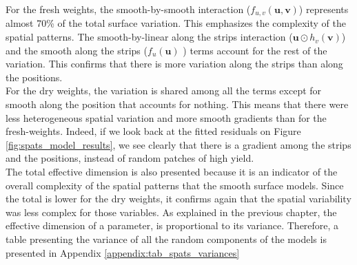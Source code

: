 For the fresh weights, the smooth-by-smooth interaction ($f_{u, v}(\boldsymbol{u}, \boldsymbol{v})$) represents almost 70\% of the total surface variation. This emphasizes the complexity of the spatial patterns. The smooth-by-linear along the strips interaction ($\boldsymbol{u} \odot h_{v}(\boldsymbol{v})$) and the smooth along the strips ($f_{u}(\mathbf{u})$ ) terms account for the rest of the variation. This confirms that there is more variation along the strips than along the positions.\\

For the dry weights, the variation is shared among all the terms except for smooth along the position that accounts for nothing. This means that there were less heterogeneous spatial variation and more smooth gradients than for the fresh-weights. Indeed, if we look back at the fitted residuals on Figure \ref{fig:spats_model_results}, we see clearly that there is a gradient among the strips and the positions, instead of random patches of high yield.\\

The total effective dimension is also presented because it is an indicator of the overall complexity of the spatial patterns that the smooth surface models. Since the total is lower for the dry weights, it confirms again that the spatial variability was less complex for those variables. As explained in the previous chapter, the effective dimension of a parameter, is proportional to its variance. Therefore, a table presenting the variance of all the random components of the models is presented in Appendix \ref{appendix:tab_spats_variances}

